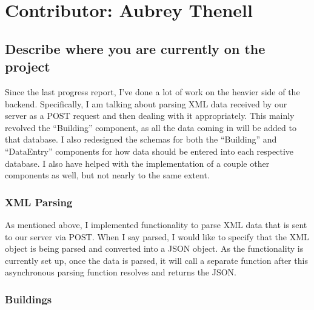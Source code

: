 \documentclass[letterpaper,10pt,serif,draftclsnofoot,onecolumn,compsoc,titlepage]{IEEEtran}
\begin{document}
\section{Contributor: Aubrey Thenell}
\subsection{Describe where you are currently on the project}
Since the last progress report, I've done a lot of work on the heavier side of the backend. Specifically, I am talking about parsing XML data received by our server as a POST request and then dealing with it appropriately. This mainly revolved the ``Building'' component, as all the data coming in will be added to that database. I also redesigned the schemas for both the ``Building'' and ``DataEntry'' components for how data should be entered into each respective database. I also have helped with the implementation of a couple other components as well, but not nearly to the same extent.

\subsubsection{XML Parsing}
As mentioned above, I implemented functionality to parse XML data that is sent to our server via POST. When I say parsed, I would like to specify that the XML object is being parsed and converted into a JSON object. As the functionality is currently set up, once the data is parsed, it will call a separate function after this asynchronous parsing function resolves and returns the JSON. 

\subsubsection{Buildings}
\end{document}
